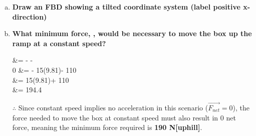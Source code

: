 \documentclass{agony}
\begin{document}
\begin{prob}
	\phantom{}
	\begin{enumerate}[(a)]
		\item \textbf{Draw an FBD showing a tilted coordinate system (label positive x-direction)}\\
		      \begin{center}
			      
		      \end{center}

		\item \textbf{What minimum force, , would be  necessary to move the box up the ramp at a constant speed?}
		      \begin{solution}
			       &=  -  - \\
			      0 &=  - 15(9.81)\degree - 110\\
			       &= 15(9.81)\degree + 110\\
			       &= 194.4~\\
		      \end{solution}
		      $\therefore$ Since constant speed implies no acceleration in this scenario ($\vec{F_{net}}=0$), the force needed to move the box at constant speed must also result in 0 net force, meaning the minimum force required is \textbf{190 N[uphill]}.
	\end{enumerate}
\end{prob}

\newpage
\end{document}
